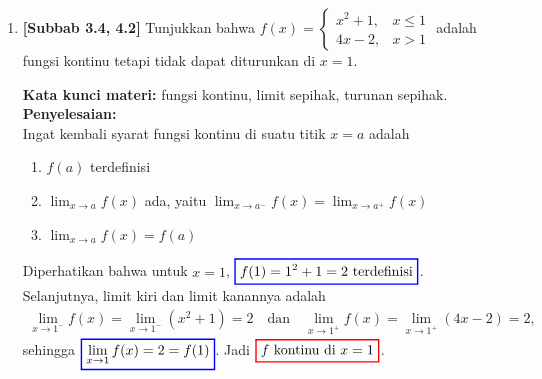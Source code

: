 \documentclass[10pt,openany,a4paper]{article}
\theoremstyle{definition}
\theoremstyle{definition}
\theoremstyle{plain}
\newenvironment{jawab}[2][tes]{%
\par\noindent\textbf{Kata kunci materi:} #1.\\
\textbf{Penyelesaian:} #2%
}{}
\begin{document}
\begin{enumerate}
\begin{jawab}[titik tengah, jarak dua titik, garis tegak lurus, jarak titik ke garis]
{\begin{enumerate}
            \begin{align*}
                d=\frac{|2(-1)+2-5|}{\sqrt{2^2+1^2}}=\frac{5}{\sqrt{5}}=\colorlet{oldcolor}{.}
        \color{red}
        \setlength{\fboxrule}{1pt} \boxed{\color{oldcolor}\sqrt{5}}\color{oldcolor}.
            \end{align*}
            Hasil ini masuk akal, karena garis tersebut adalah garis sumbu dari ruas $AB$ (melalui titik tengah dan tegak lurus $AB$), sehingga jarak $A$ ke garis tersebut sama dengan setengah panjang $AB$.
        \end{enumerate}
    }
    \end{jawab}

    \item \textbf{[Subbab 3.4, 4.2]} Tunjukkan bahwa $f(x)=\begin{cases}
        x^2+1, & x\leq 1\\
        4x-2, & x>1
    \end{cases}$ adalah fungsi kontinu tetapi tidak dapat diturunkan di $x=1$.
    \begin{jawab}[fungsi kontinu, limit sepihak, turunan sepihak]{~\\
        Ingat kembali syarat fungsi kontinu di suatu titik \(x = a\) adalah
        \begin{enumerate}
            \item \(f(a)\) terdefinisi
            \item \(\displaystyle \lim_{x \to a} f(x)\) ada, yaitu $\displaystyle \lim_{x \to a^-} f(x) = \lim_{x \to a^+} f(x)$
            \item \(\displaystyle\lim_{x \to a} f(x) = f(a)\)
        \end{enumerate}
        Diperhatikan bahwa untuk $x=1$, $\colorlet{oldcolor}{.}
        \color{blue}
        \setlength{\fboxrule}{1pt} \boxed{\color{oldcolor}f(1) = 1^2+1 = 2~\text{terdefinisi}}\color{oldcolor}$. Selanjutnya, limit kiri dan limit kanannya adalah
        \begin{align*}
            \lim_{x\to 1^-} f(x) = \lim_{x\to 1^-} (x^2+1) = 2 \quad\text{dan}\quad \lim_{x\to 1^+} f(x) = \lim_{x\to 1^+} (4x-2) = 2,
        \end{align*}
        sehingga $\colorlet{oldcolor}{.}
        \color{blue}
        \setlength{\fboxrule}{1pt} \boxed{\color{oldcolor}\lim_{x\to 1} f(x) = 2 = f(1)}\color{oldcolor}$. Jadi $\colorlet{oldcolor}{.}
        \color{red}
        \setlength{\fboxrule}{1pt} \boxed{\color{oldcolor}f \text{ kontinu di } x=1}\color{oldcolor}$.\\
}
\end{jawab}
\end{enumerate}
\end{document}

